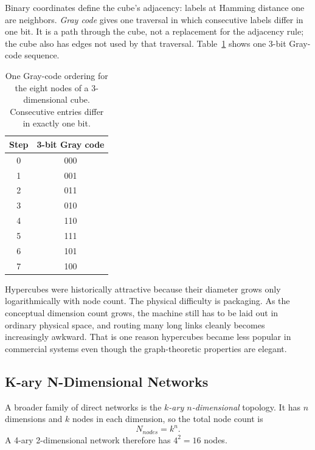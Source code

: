 Binary coordinates define the cube's adjacency: labels at Hamming distance one are neighbors.
\textit{Gray code} gives one traversal in which consecutive labels differ in one bit.
It is a path through the cube, not a replacement for the adjacency rule; the cube also has edges not used by that traversal.
Table~\ref{tab:pin-gray-code} shows one 3-bit Gray-code sequence.
\begin{table}[t]
    \centering
    \renewcommand{\arraystretch}{1.15}
    \begin{tabular}{|c|c|}
        \hline
        Step & 3-bit Gray code \\
        \hline
        0    & 000             \\
        1    & 001             \\
        2    & 011             \\
        3    & 010             \\
        4    & 110             \\
        5    & 111             \\
        6    & 101             \\
        7    & 100             \\
        \hline
    \end{tabular}
    \caption{One Gray-code ordering for the eight nodes of a 3-dimensional cube. Consecutive entries differ in exactly one bit.}
    \label{tab:pin-gray-code}
\end{table}

Hypercubes were historically attractive because their diameter grows only logarithmically with node count.
The physical difficulty is packaging.
As the conceptual dimension count grows, the machine still has to be laid out in ordinary physical space, and routing many long links cleanly becomes increasingly awkward.
That is one reason hypercubes became less popular in commercial systems even though the graph-theoretic properties are elegant.

\subsection{K-ary N-Dimensional Networks}\label{subsec:pin-kary}
A broader family of direct networks is the \textit{$k$-ary $n$-dimensional} topology.
It has $n$ dimensions and $k$ nodes in each dimension, so the total node count is
\begin{equation}\label{eq:ch10-formula-kary}
    N_{nodes}=k^n.
\end{equation}
A 4-ary 2-dimensional network therefore has $4^2=16$ nodes.

